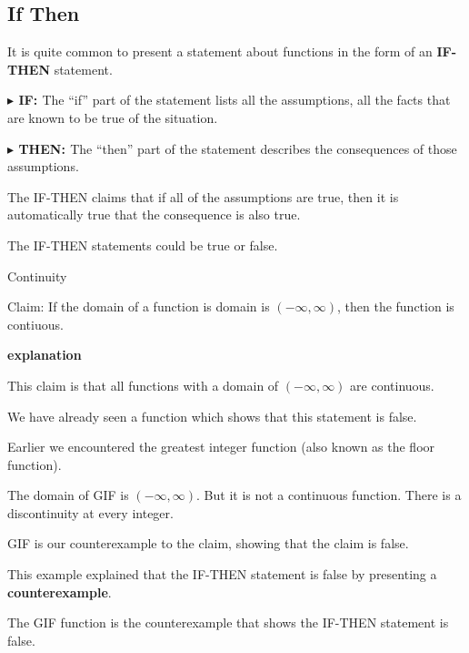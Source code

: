 \documentclass{ximera}
\begin{document}
\subsection*{If Then}


It is quite common to present a statement about functions in the form of an \textbf{IF-THEN} statement.


\textbf{\textcolor{blue!55!black}{$\blacktriangleright$ IF: }} The ``if'' part of the statement lists all the assumptions, all the facts that are known to be true of the situation.


\textbf{\textcolor{blue!55!black}{$\blacktriangleright$ THEN: }} The ``then'' part of the statement describes the consequences of those assumptions.




The IF-THEN claims that if all of the assumptions are true, then it is automatically true that the consequence is also true.






The IF-THEN statements could be true or false.



\begin{example} Continuity


Claim: If the domain of a function is domain is $(-\infty, \infty)$, then the function is contiuous.


\textbf{\textcolor{red!75!green}{explanation}} 


This claim is that all functions with a domain of $(-\infty, \infty)$ are continuous.


We have already seen a function which shows that this statement is false.



Earlier we encountered the greatest integer function (also known as the floor function).


The domain of GIF is $(-\infty, \infty)$.  But it is not a continuous function.  There is a discontinuity at every integer.

GIF is our counterexample to the claim, showing that the claim is false.

\end{example}


This example explained that the IF-THEN statement is false by presenting a \textbf{counterexample}.


The GIF function is the counterexample that shows the IF-THEN statement is false.
\end{document}
